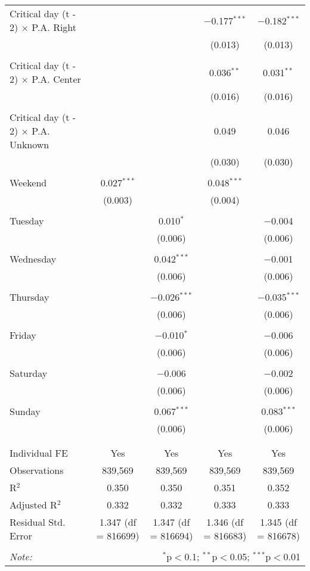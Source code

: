 \documentclass[
]{article}
\begin{document}
\begin{table}[!htbp]
{\begin{tabular}{@{\extracolsep{5pt}}lcccc}
 Critical day (t - 2) $\times$ P.A. Right &  &  & $-$0.177$^{***}$ & $-$0.182$^{***}$ \\ 
  &  &  & (0.013) & (0.013) \\ 
  & & & & \\ 
 Critical day (t - 2) $\times$ P.A. Center &  &  & 0.036$^{**}$ & 0.031$^{**}$ \\ 
  &  &  & (0.016) & (0.016) \\ 
  & & & & \\ 
 Critical day (t - 2) $\times$ P.A. Unknown &  &  & 0.049 & 0.046 \\ 
  &  &  & (0.030) & (0.030) \\ 
  & & & & \\ 
 Weekend & 0.027$^{***}$ &  & 0.048$^{***}$ &  \\ 
  & (0.003) &  & (0.004) &  \\ 
  & & & & \\ 
 Tuesday &  & 0.010$^{*}$ &  & $-$0.004 \\ 
  &  & (0.006) &  & (0.006) \\ 
  & & & & \\ 
 Wednesday &  & 0.042$^{***}$ &  & $-$0.001 \\ 
  &  & (0.006) &  & (0.006) \\ 
  & & & & \\ 
 Thursday &  & $-$0.026$^{***}$ &  & $-$0.035$^{***}$ \\ 
  &  & (0.006) &  & (0.006) \\ 
  & & & & \\ 
 Friday &  & $-$0.010$^{*}$ &  & $-$0.006 \\ 
  &  & (0.006) &  & (0.006) \\ 
  & & & & \\ 
 Saturday &  & $-$0.006 &  & $-$0.002 \\ 
  &  & (0.006) &  & (0.006) \\ 
  & & & & \\ 
 Sunday &  & 0.067$^{***}$ &  & 0.083$^{***}$ \\ 
  &  & (0.006) &  & (0.006) \\ 
  & & & & \\ 
\hline \\[-1.8ex] 
Individual FE & Yes & Yes & Yes & Yes \\ 
Observations & 839,569 & 839,569 & 839,569 & 839,569 \\ 
R$^{2}$ & 0.350 & 0.350 & 0.351 & 0.352 \\ 
Adjusted R$^{2}$ & 0.332 & 0.332 & 0.333 & 0.333 \\ 
Residual Std. Error & 1.347 (df = 816699) & 1.347 (df = 816694) & 1.346 (df = 816683) & 1.345 (df = 816678) \\ 
\hline 
\hline \\[-1.8ex] 
\textit{Note:}  & \multicolumn{4}{r}{$^{*}$p$<$0.1; $^{**}$p$<$0.05; $^{***}$p$<$0.01} \\ 
\end{tabular}
} 
\end{table} 
\newpage
\end{document}
